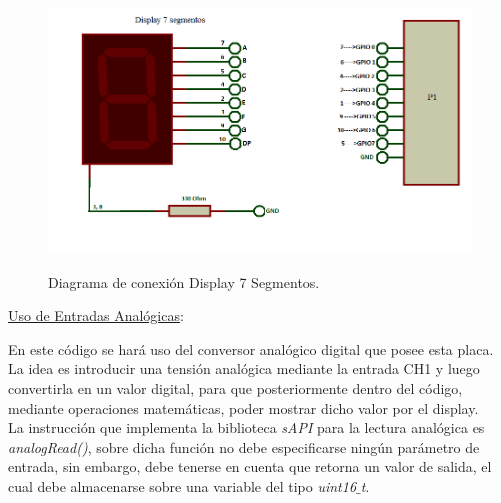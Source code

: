 \documentclass[12pt,letterpaper]{article}
\begin{document}
\begin{figure}[H]
\centering
\includegraphics[width=12 cm]{figuras/dsp7seg.png}\\
\caption{Diagrama de conexión Display 7 Segmentos.}
\label{Fig23}
\end{figure}

\underline{Uso de Entradas Analógicas}:

En este código se hará uso del conversor analógico digital que posee esta placa. La idea es introducir una tensión analógica mediante la entrada CH1 y luego convertirla en un valor digital, para que posteriormente dentro del código, mediante operaciones matemáticas, poder mostrar dicho valor por el display.
 \\
 
La instrucción que implementa la biblioteca \textit{sAPI} para la lectura analógica es \textit{analogRead()}, sobre dicha función no debe especificarse ningún parámetro de entrada, sin embargo, debe tenerse en cuenta que retorna un valor de salida, el cual debe almacenarse sobre una variable del tipo \textit{uint16$\_$t}.
\end{document}
